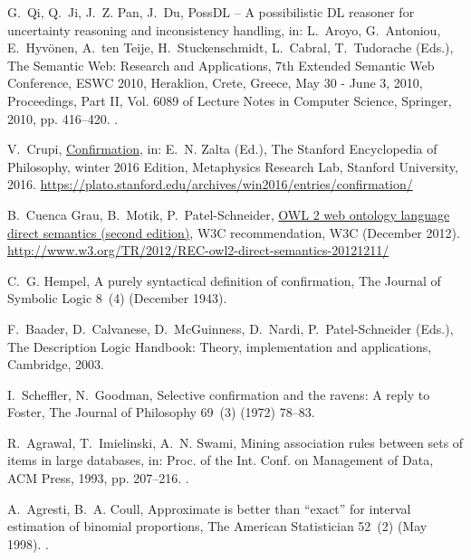 \documentclass[review]{elsarticle}
\theoremstyle{definition}
\begin{document}
\begin{thebibliography}{10}
G.~Qi, Q.~Ji, J.~Z. Pan, J.~Du, {PossDL} -- {A} possibilistic {DL} reasoner for
  uncertainty reasoning and inconsistency handling, in: L.~Aroyo, G.~Antoniou,
  E.~Hyv{\"{o}}nen, A.~ten Teije, H.~Stuckenschmidt, L.~Cabral, T.~Tudorache
  (Eds.), The Semantic Web: Research and Applications, 7th Extended Semantic
  Web Conference, {ESWC} 2010, Heraklion, Crete, Greece, May 30 - June 3, 2010,
  Proceedings, Part {II}, Vol. 6089 of Lecture Notes in Computer Science,
  Springer, 2010, pp. 416--420.
\newblock \href {http://dx.doi.org/10.1007/978-3-642-13489-0_35}
  {}.

V.~Crupi,
  \href{https://plato.stanford.edu/archives/win2016/entries/confirmation/}{Confirmation},
  in: E.~N. Zalta (Ed.), The Stanford Encyclopedia of Philosophy, winter 2016
  Edition, Metaphysics Research Lab, Stanford University, 2016.
\newline\urlprefix\url{https://plato.stanford.edu/archives/win2016/entries/confirmation/}

B.~{Cuenca Grau}, B.~Motik, P.~{Patel-Schneider},
  \href{http://www.w3.org/TR/2012/REC-owl2-direct-semantics-20121211/}{{OWL} 2
  web ontology language direct semantics (second edition)}, {W3C}
  recommendation, W3C (December 2012).
\newline\urlprefix\url{http://www.w3.org/TR/2012/REC-owl2-direct-semantics-20121211/}

C.~G. Hempel, A purely syntactical definition of confirmation, The Journal of
  Symbolic Logic 8~(4) (December 1943).

F.~Baader, D.~Calvanese, D.~McGuinness, D.~Nardi, P.~Patel-Schneider (Eds.),
  The Description Logic Handbook: Theory, implementation and applications,
  Cambridge, 2003.

I.~Scheffler, N.~Goodman, Selective confirmation and the ravens: A reply to
  {Foster}, The Journal of Philosophy 69~(3) (1972) 78--83.

R.~Agrawal, T.~Imielinski, A.~N. Swami, Mining association rules between sets
  of items in large databases, in: Proc. of the Int. Conf. on Management of
  Data, ACM Press, 1993, pp. 207--216.
\newblock \href {http://dx.doi.org/10.1145/170035.170072}
  {}.

A.~Agresti, B.~A. Coull, Approximate is better than ``exact'' for interval
  estimation of binomial proportions, The American Statistician 52~(2) (May 1998).
\newblock \href {http://dx.doi.org/10.1080/00031305.1998.10480550}
  {}.


\end{thebibliography}
\end{document}
